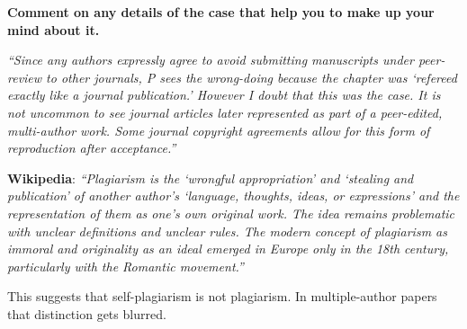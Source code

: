 \documentclass[portrait,11pt]{seminar}
\begin{document}



\es
\bs
{\bf Comment on any details of the case that help you to make up your mind about it.}


{\it ``Since any authors expressly agree to avoid submitting manuscripts under peer-review to other journals, P sees the wrong-doing because the chapter was `refereed exactly like a journal publication.' However I doubt that this was the case. It is not uncommon to see journal articles later represented as part of a peer-edited, multi-author work. Some journal copyright agreements allow for this form of reproduction after acceptance.''}


\es

\bs
\it 

\es

\bs

{\bf Wikipedia}: {\it ``Plagiarism is the `wrongful appropriation' and `stealing and publication' of another author's `language, thoughts, ideas, or expressions' and the representation of them as one's own original work. The idea remains problematic with unclear definitions and unclear rules. The modern concept of plagiarism as immoral and originality as an ideal emerged in Europe only in the 18th century, particularly with the Romantic movement.''
}

This suggests that self-plagiarism is not plagiarism. In multiple-author papers that distinction gets blurred.
\end{document}
